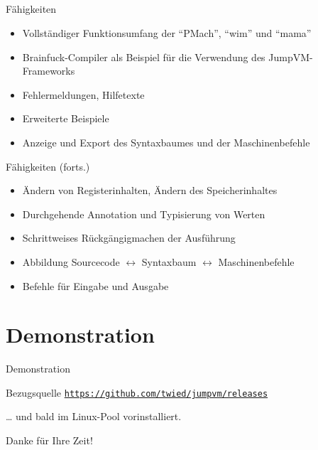 \documentclass{beamer}
\begin{document}
\subsection*{}
\begin{frame}{Fähigkeiten}
	\begin{itemize}
	\item<2->Vollständiger Funktionsumfang der \enquote{PMach}, \enquote{wim}
		und \enquote{mama}
	\item<3-> Brainfuck-Compiler als Beispiel für die Verwendung des 
		JumpVM-Frameworks
	\item<4->Fehlermeldungen, Hilfetexte
	\item<5-> Erweiterte Beispiele
	\item<6-> Anzeige und Export des Syntaxbaumes und der Maschinenbefehle
	\end{itemize}
\end{frame}

\begin{frame}{Fähigkeiten (forts.)}
	\begin{itemize}
	\item<1-> Ändern von Registerinhalten, Ändern des Speicherinhaltes
	\item<2-> Durchgehende Annotation und Typisierung von Werten
	\item<3-> Schrittweises Rückgängigmachen der Ausführung
	\item<4-> Abbildung Sourcecode $\leftrightarrow$ Syntaxbaum $\leftrightarrow$ 
		Maschinenbefehle
	\item<5-> Befehle für Eingabe und Ausgabe
	\end{itemize}
\end{frame}

\section{Demonstration}
\begin{frame}{Demonstration}
	\vfill{}
	\begin{block}{Bezugsquelle}
		\href{https://github.com/twied/jumpvm/releases}
		{\texttt{https://github.com/twied/jumpvm/releases}}
		\ComputerMouse{}
		
		\hfill{} \ldots{} und bald\texttrademark{} im Linux-Pool vorinstalliert.
	\end{block}
	\vfill{}
	\begin{alertblock}{Danke für Ihre Zeit!}
	\end{alertblock}
	\vfill{}
\end{frame}
\end{document}
